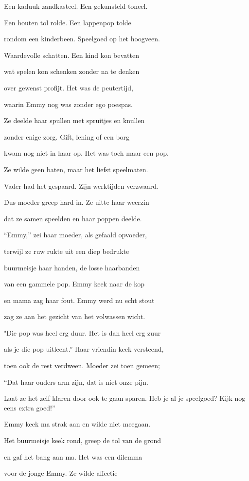 Een kaduuk zandkasteel.
Een gekunsteld toneel.

Een houten tol rolde.
Een lappenpop tolde

rondom een kinderbeen.
Speelgoed op het hoogveen.

Waardevolle schatten.
Een kind kon bevatten

wat spelen kon schenken
zonder na te denken

over gewenst profijt.
Het was de peutertijd,

waarin Emmy nog was
zonder ego poespas.

Ze deelde haar spullen
met spruitjes en knullen

zonder enige zorg.
Gift, lening of een borg

kwam nog niet in haar op.
Het was toch maar een pop.

Ze wilde geen baten,
maar het liefst speelmaten.

Vader had het gespaard.
Zijn werktijden verzwaard.

Dus moeder greep hard in.
Ze uitte haar weerzin

dat ze samen speelden
en haar poppen deelde.

“Emmy,” zei haar moeder,
als gefaald opvoeder,

terwijl ze ruw rukte
uit een diep bedrukte

buurmeisje haar handen,
de losse haarbanden

van een gammele pop.
Emmy keek naar de kop

en mama zag haar fout.
Emmy werd nu echt stout

zag ze aan het gezicht
van het volwassen wicht.

"Die pop was heel erg duur.
Het is dan heel erg zuur

als je die pop uitleent.”
Haar vriendin keek versteend,

toen ook de rest verdween.
Moeder zei toen gemeen;

“Dat haar ouders arm zijn,
dat is niet onze pijn.

Laat ze het zelf klaren
door ook te gaan sparen.
Heb je al je speelgoed?
Kijk nog eens extra goed!”

Emmy keek ma strak aan
en wilde niet meegaan.

Het buurmeisje keek rond,
greep de tol van de grond

en gaf het bang aan ma.
Het was een dilemma

voor de jonge Emmy.
Ze wilde affectie

